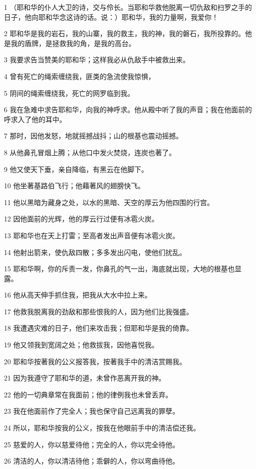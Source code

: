 \par 1 （耶和华的仆人大卫的诗，交与伶长。当耶和华救他脱离一切仇敌和扫罗之手的日子，他向耶和华念这诗的话。说：）耶和华，我的力量啊，我爱你！
\par 2 耶和华是我的岩石，我的山寨，我的救主，我的神，我的磐石，我所投靠的。他是我的盾牌，是拯救我的角，是我的高台。
\par 3 我要求告当赞美的耶和华；这样我必从仇敌手中被救出来。
\par 4 曾有死亡的绳索缠绕我，匪类的急流使我惊惧，
\par 5 阴间的绳索缠绕我，死亡的网罗临到我。
\par 6 我在急难中求告耶和华，向我的神呼求。他从殿中听了我的声音；我在他面前的呼求入了他的耳中。
\par 7 那时，因他发怒，地就摇撼战抖；山的根基也震动摇撼。
\par 8 从他鼻孔冒烟上腾；从他口中发火焚烧，连炭也著了。
\par 9 他又使天下垂，亲自降临，有黑云在他脚下。
\par 10 他坐著基路伯飞行；他藉著风的翅膀快飞。
\par 11 他以黑暗为藏身之处，以水的黑暗、天空的厚云为他四围的行宫。
\par 12 因他面前的光辉，他的厚云行过便有冰雹火炭。
\par 13 耶和华也在天上打雷；至高者发出声音便有冰雹火炭。
\par 14 他射出箭来，使仇敌四散；多多发出闪电，使他们扰乱。
\par 15 耶和华啊，你的斥责一发，你鼻孔的气一出，海底就出现，大地的根基也显露。
\par 16 他从高天伸手抓住我，把我从大水中拉上来。
\par 17 他救我脱离我的劲敌和那些恨我的人，因为他们比我强盛。
\par 18 我遭遇灾难的日子，他们来攻击我；但耶和华是我的倚靠。
\par 19 他又领我到宽阔之处；他救拔我，因他喜悦我。
\par 20 耶和华按著我的公义报答我，按著我手中的清洁赏赐我。
\par 21 因为我遵守了耶和华的道，未曾作恶离开我的神。
\par 22 他的一切典章常在我面前；他的律例我也未曾丢弃。
\par 23 我在他面前作了完全人；我也保守自己远离我的罪孽。
\par 24 所以，耶和华按我的公义，按我在他眼前手中的清洁偿还我。
\par 25 慈爱的人，你以慈爱待他；完全的人，你以完全待他。
\par 26 清洁的人，你以清洁待他；乖僻的人，你以弯曲待他。
